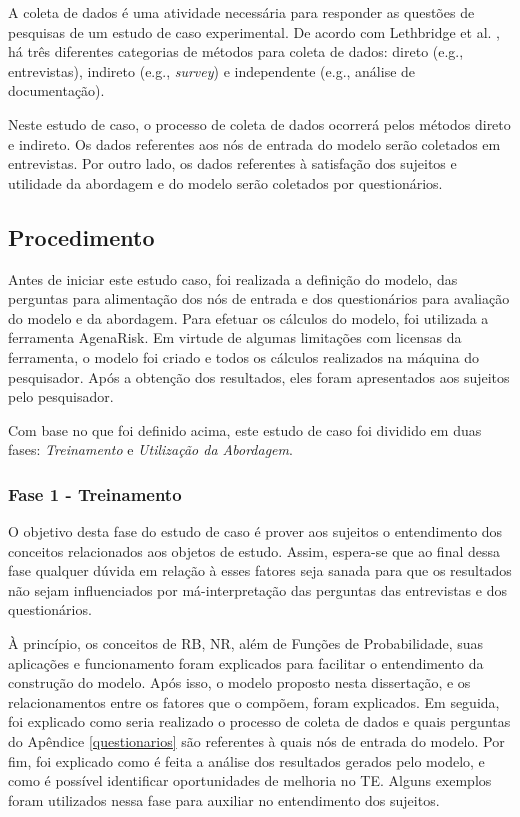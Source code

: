 A coleta de dados é uma atividade necessária para responder as questões de pesquisas de um estudo de caso experimental. De acordo com Lethbridge et al. \cite{lethbridge}, há três diferentes categorias de métodos para coleta de dados: direto (e.g., entrevistas), indireto (e.g., \textit{survey}) e independente (e.g., análise de documentação).

Neste estudo de caso, o processo de coleta de dados ocorrerá pelos métodos direto e indireto. Os dados referentes aos nós de entrada do modelo serão coletados em entrevistas. Por outro lado, os dados referentes à satisfação dos sujeitos e utilidade da abordagem e do modelo serão coletados por questionários.

\subsection{Procedimento}
\label{estudodecaso:design:procedimento}

Antes de iniciar este estudo caso, foi realizada a definição do modelo, das perguntas para alimentação dos nós de entrada e dos questionários para avaliação do modelo e da abordagem. Para efetuar os cálculos do modelo, foi utilizada a ferramenta AgenaRisk. Em virtude de algumas limitações com licensas da ferramenta, o modelo foi criado e todos os cálculos realizados na máquina do pesquisador. Após a obtenção dos resultados, eles foram apresentados aos sujeitos pelo pesquisador.

Com base no que foi definido acima, este estudo de caso foi dividido em duas fases: \textit{Treinamento} e \textit{Utilização da Abordagem}.

\subsubsection{Fase 1 - Treinamento}
\label{estudodecaso:design:procedimento:treinamento}

O objetivo desta fase do estudo de caso é prover aos sujeitos o entendimento dos conceitos relacionados aos objetos de estudo. Assim, espera-se que ao final dessa fase qualquer dúvida em relação à esses fatores seja sanada para que os resultados não sejam influenciados por má-interpretação das perguntas das entrevistas e dos questionários.

À princípio, os conceitos de RB, NR, além de Funções de Probabilidade, suas aplicações e funcionamento foram explicados para facilitar o entendimento da construção do modelo. Após isso, o modelo proposto nesta dissertação, e os relacionamentos entre os fatores que o compõem, foram explicados. Em seguida, foi explicado como seria realizado o processo de coleta de dados e quais perguntas do Apêndice \ref{questionarios} são referentes à quais nós de entrada do modelo. Por fim, foi explicado como é feita a análise dos resultados gerados pelo modelo, e como é possível identificar oportunidades de melhoria no TE. Alguns exemplos foram utilizados nessa fase para auxiliar no entendimento dos sujeitos.

